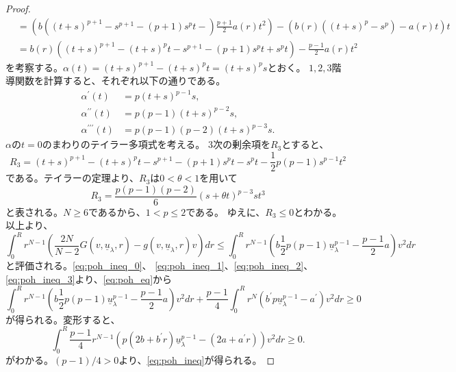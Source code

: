 \begin{proof}
\begin{align*}
  &= \left( b \left( (t+s)^{p+1} - s^{p+1} - (p+1)s^p t - \right)
  \frac{p+1}{2} a(r) t^2 \right) - \left( b(r) \left( (t+s)^p - s^p
  \right) - a(r) t \right) t \\
  &= b(r) \left( (t+s)^{p+1} - (t+s)^p t - s^{p+1} - (p+1)s^p t + s^p
  t \right) -\frac{p-1}{2} a(r) t^2
 \end{align*}
 を考察する。$\alpha(t) = (t+s)^{p+1} - (t+s)^p t = (t+s)^p s$とおく。
 $1, 2, 3$階導関数を計算すると、それぞれ以下の通りである。
 \begin{align*}
  \alpha^\prime(t) &= p(t+s)^{p-1}s, \\
  \alpha^{\prime\prime}(t) &= p(p-1)(t+s)^{p-2}s, \\
  \alpha^{\prime\prime\prime}(t) &= p(p-1)(p-2)(t+s)^{p-3}s.
 \end{align*}
 $\alpha$の$t = 0$のまわりのテイラー多項式を考える。
 $3$次の剰余項を$R_3$とすると、
 \[
  R_3 = (t+s)^{p+1} - (t+s)^p t -s^{p+1} -(p+1)s^p t - s^p t -
 \frac{1}{2}p(p-1) s^{p-1}t^2
 \]
 である。テイラーの定理より、$R_3$は$0 < \theta < 1$を用いて
 \[
  R_3 = \frac{p(p-1)(p-2)}{6}(s + \theta t)^{p-3} st^3
 \]
 と表される。$N \geq 6$であるから、$1 < p \leq 2$である。
 ゆえに、$R_3 \leq 0$とわかる。以上より、
 \begin{equation}
  \int_0^R r^{N-1} \left( \frac{2N}{N-2} G(v, \underline{u}_\lambda,
           r) - g(v, \underline{u}_\lambda, r) v \right) dr \leq \int_0^R
  r^{N-1} \left( b \frac{1}{2} p(p-1) \underline{u}_\lambda^{p-1} -
 \frac{p-1}{2} a  \right) v^2 dr \label{eq:poh_ineq_3}
 \end{equation}
 と評価される。\eqref{eq:poh_ineq_0}、
 \eqref{eq:poh_ineq_1}、\eqref{eq:poh_ineq_2}、
 \eqref{eq:poh_ineq_3}より、\eqref{eq:poh_eq}から
 \[
  \int_0^R r^{N-1} \left( b \frac{1}{2} p(p-1)
 \underline{u}_\lambda^{p-1} - \frac{p-1}{2} a \right) v^2 dr 
 + \frac{p-1}{4} \int_0^R r^N \left( b^\prime p
 \underline{u}_\lambda^{p-1} - a^\prime \right) v^2 dr \geq 0
 \]
 が得られる。変形すると、
 \[
  \int_0^R \frac{p-1}{4}  r^{N-1} \left( p(2b + b^\prime r)
 \underline{u}_\lambda^{p-1} 
 - (2a + a^\prime r) \right) v^2 dr \geq 0.
 \]
 がわかる。$(p-1)/4 > 0$より、\eqref{eq:poh_ineq}が得られる。\qedhere
\end{proof}

